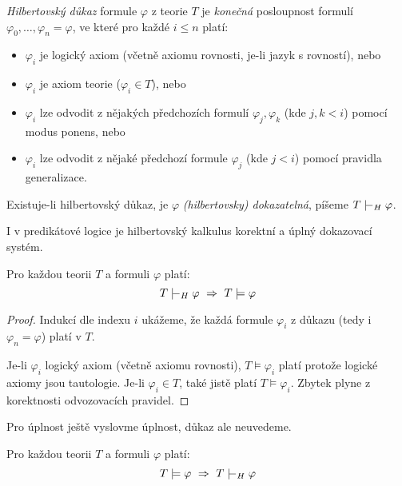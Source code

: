 \begin{definition}
    \emph{Hilbertovský důkaz} formule $\varphi$ z teorie $T$ je \emph{konečná} posloupnost formulí $\varphi_0, \dots, \varphi_n=\varphi$, ve které pro každé $i\le n$ platí:
    \begin{itemize}
    \item $\varphi_i$ je logický axiom (včetně axiomu rovnosti, je-li jazyk s rovností), nebo
    \item $\varphi_i$ je axiom teorie ($\varphi_i \in T$), nebo
    \item $\varphi_i$ lze odvodit z nějakých předchozích formulí $\varphi_j,\varphi_k$ (kde $j,k<i$) pomocí modus ponens, nebo
    \item $\varphi_i$ lze odvodit z nějaké předchozí formule $\varphi_j$ (kde $j<i$) pomocí pravidla generalizace.
    \end{itemize}
    Existuje-li hilbertovský důkaz, je $\varphi$ \emph{(hilbertovsky) dokazatelná}, píšeme $T\proves_H\varphi$.           
\end{definition}

I v predikátové logice je hilbertovský kalkulus korektní a úplný dokazovací systém.

\begin{theorem}
Pro každou teorii $T$ a formuli $\varphi$ platí: 
$$
T\proves_H \varphi\ \Rightarrow\ T\models\varphi
$$ 
\end{theorem}
\begin{proof}
Indukcí dle indexu $i$ ukážeme, že každá formule $\varphi_i$ z důkazu (tedy i $\varphi_n=\varphi$) platí v $T$.

Je-li $\varphi_i$ logický axiom (včetně axiomu rovnosti), $T \models \varphi_i$ platí protože logické axiomy jsou tautologie. Je-li $\varphi_i\in T$, také jistě platí $T \models \varphi_i$. Zbytek plyne z korektnosti odvozovacích pravidel.
\end{proof}

Pro úplnost ještě vyslovme úplnost, důkaz ale neuvedeme.

\begin{theorem}
Pro každou teorii $T$ a formuli $\varphi$ platí: 
$$
T\models\varphi\ \Rightarrow\ T\proves_H\varphi
$$
\end{theorem}
